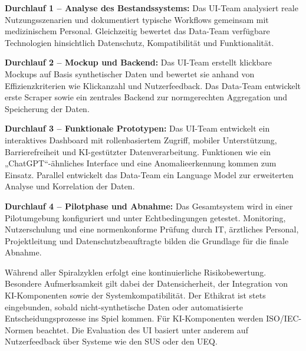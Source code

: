 \textbf{Durchlauf 1 – Analyse des Bestandssystems:} Das UI-Team analysiert reale Nutzungsszenarien und dokumentiert typische Workflows gemeinsam mit medizinischem Personal. Gleichzeitig bewertet das Data-Team verfügbare Technologien hinsichtlich Datenschutz, Kompatibilität und Funktionalität.

\textbf{Durchlauf 2 – Mockup und Backend:} Das UI-Team erstellt klickbare Mockups auf Basis synthetischer Daten und bewertet sie anhand von Effizienzkriterien wie Klickanzahl und Nutzerfeedback. Das Data-Team entwickelt erste Scraper sowie ein zentrales Backend zur normgerechten Aggregation und Speicherung der Daten.

\textbf{Durchlauf 3 – Funktionale Prototypen:} Das UI-Team entwickelt ein interaktives Dashboard mit rollenbasiertem Zugriff, mobiler Unterstützung, Barrierefreiheit und KI-gestützter Datenverarbeitung. Funktionen wie ein „ChatGPT“-ähnliches Interface und eine Anomalieerkennung kommen zum Einsatz. Parallel entwickelt das Data-Team ein Language Model zur erweiterten Analyse und Korrelation der Daten.

\textbf{Durchlauf 4 – Pilotphase und Abnahme:} Das Gesamtsystem wird in einer Pilotumgebung konfiguriert und unter Echtbedingungen getestet. Monitoring, Nutzerschulung und eine normenkonforme Prüfung durch IT, ärztliches Personal, Projektleitung und Datenschutzbeauftragte bilden die Grundlage für die finale Abnahme.


Während aller Spiralzyklen erfolgt eine kontinuierliche Risikobewertung. Besondere Aufmerksamkeit gilt dabei der Datensicherheit, der Integration von KI-Komponenten sowie der Systemkompatibilität. Der Ethikrat ist stets eingebunden, sobald nicht-synthetische Daten oder automatisierte Entscheidungsprozesse ins Spiel kommen. Für KI-Komponenten werden ISO/IEC-Normen beachtet. Die Evaluation des UI basiert unter anderem auf Nutzerfeedback über Systeme wie den SUS oder den UEQ.
